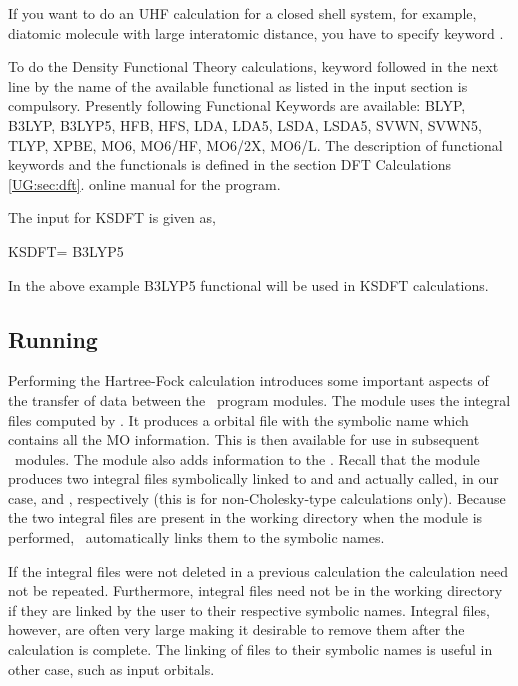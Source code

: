 If you want to do an UHF calculation for a closed shell system, for example,
diatomic molecule with large interatomic distance, you have to specify keyword
.

To do the Density Functional Theory calculations, keyword  followed
in the next line by the name of the available functional as listed in the input
section is compulsory.  Presently following Functional Keywords are available:
BLYP, B3LYP, B3LYP5, HFB, HFS, LDA, LDA5, LSDA, LSDA5, SVWN, SVWN5, TLYP, XPBE,
MO6, MO6/HF, MO6/2X, MO6/L.
The description of functional keywords and the functionals is defined in the 
\ifmanual
section DFT Calculations \ref{UG:sec:dft}.
\else
online manual for the  program.
\fi

The input for KSDFT is given as,
\begin{inputlisting}
KSDFT= B3LYP5
\end{inputlisting}
In the above example B3LYP5 functional will be used in  KSDFT calculations.


\subsection{Running }

Performing the Hartree-Fock calculation introduces some important
aspects of the transfer of data between the \molcas\ program modules.
The  module uses the integral files computed by
.  It produces a orbital file with the symbolic name
 which contains all the MO information. This is then
available for use in subsequent \molcas\ modules.  The
 module also adds information to the .
Recall that the  module produces two integral files
symbolically linked to  and  and actually
called, in our case,  and , 
respectively (this is for non-Cholesky-type calculations only).  
Because the two integral files are present in 
the working directory when the  module is performed, \molcas\ 
automatically links them to the symbolic names.  

If the integral files were not deleted in a previous calculation
the \program{SEWARD} calculation need not be repeated.  Furthermore,
integral files need not be in the working directory if they are linked
by the user to their respective symbolic names.  Integral files,
however, are often very large making it desirable to remove them after the
calculation is complete.  The linking of files to their symbolic names
is useful in other case, such as input orbitals.

